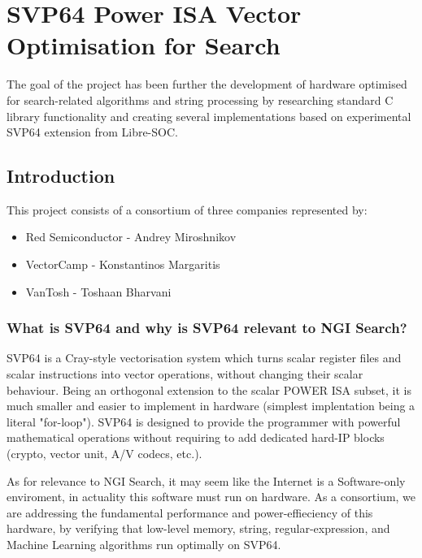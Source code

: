 \chapter{SVP64 Power ISA Vector Optimisation for Search}

The goal of the project has been further the development of hardware
optimised for search-related algorithms and string processing by
researching standard C library functionality and creating several
implementations based on experimental \acrshort{SVP64} extension from Libre-SOC.

\section{Introduction}

This project consists of a consortium of three companies represented by:

\begin{itemize}
  \item Red Semiconductor - Andrey Miroshnikov
  \item VectorCamp - Konstantinos Margaritis
  \item VanTosh - Toshaan Bharvani
\end{itemize}

\subsection{What is \acrshort{SVP64} and why is \acrshort{SVP64} relevant to NGI Search?}

\acrfull{SVP64} is a Cray-style vectorisation system which
turns scalar register files and scalar instructions into vector operations,
without changing their scalar behaviour. Being an orthogonal extension to the
scalar \acrfull{POWER} ISA subset, it is much smaller and easier to implement in
hardware (simplest implentation being a literal "for-loop"). \acrshort{SVP64} is
designed to provide the programmer with powerful mathematical operations
without requiring to add dedicated hard-IP blocks (crypto, vector unit, A/V
codecs, etc.).

As for relevance to \acrfull{NGI} Search, it may seem like the Internet is a
Software-only enviroment, in actuality this software must run on hardware.
As a consortium, we are addressing the fundamental performance and
power-effieciency of this hardware, by verifying that low-level memory,
string, regular-expression, and Machine Learning algorithms run optimally
on \acrshort{SVP64}.


